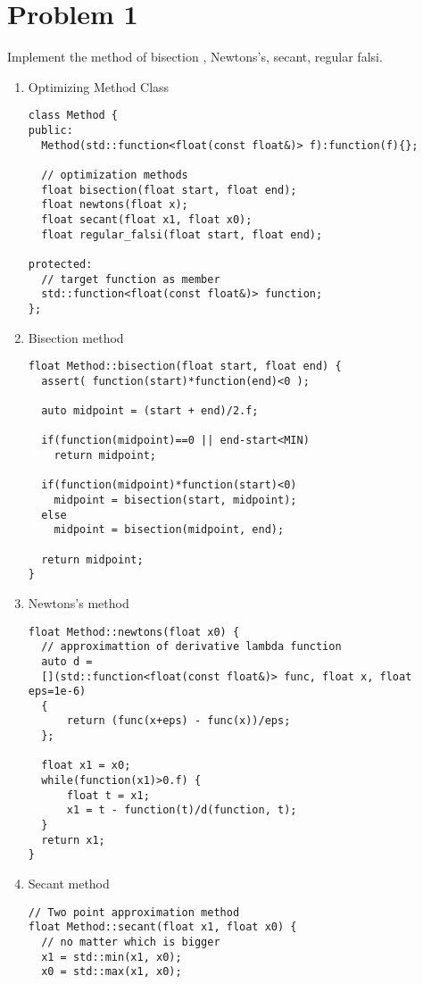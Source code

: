\documentclass[12pt,letterpaper]{article}
\begin{document}
\section*{Problem 1}

Implement the method of bisection , Newtons's, secant, regular falsi.

\begin{enumerate}

\item Optimizing Method Class
\begin{lstlisting}[style=C++]
class Method {
public:
  Method(std::function<float(const float&)> f):function(f){};

  // optimization methods
  float bisection(float start, float end);
  float newtons(float x);
  float secant(float x1, float x0);
  float regular_falsi(float start, float end);

protected:
  // target function as member
  std::function<float(const float&)> function;
};
\end{lstlisting}

\item Bisection method
\begin{lstlisting}[style=C++]
float Method::bisection(float start, float end) {
  assert( function(start)*function(end)<0 );

  auto midpoint = (start + end)/2.f;

  if(function(midpoint)==0 || end-start<MIN)
    return midpoint;

  if(function(midpoint)*function(start)<0)
    midpoint = bisection(start, midpoint);
  else
    midpoint = bisection(midpoint, end);

  return midpoint;
}
\end{lstlisting}

\newpage

\item Newtons's method
\begin{lstlisting}[style=C++]
float Method::newtons(float x0) {
  // approximattion of derivative lambda function
  auto d = 
  [](std::function<float(const float&)> func, float x, float eps=1e-6) 
  { 
      return (func(x+eps) - func(x))/eps;
  };

  float x1 = x0;
  while(function(x1)>0.f) {
      float t = x1;
      x1 = t - function(t)/d(function, t);
  }
  return x1;
}
\end{lstlisting}

\item Secant method
\begin{lstlisting}[style=C++]
// Two point approximation method
float Method::secant(float x1, float x0) {
  // no matter which is bigger
  x1 = std::min(x1, x0);
  x0 = std::max(x1, x0);


\end{lstlisting}
\end{enumerate}
\end{document}
